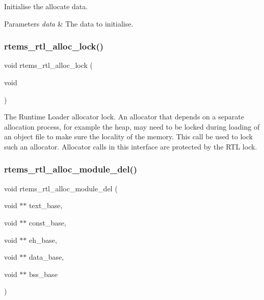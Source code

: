 Initialise the allocate data.


\begin{DoxyParams}{Parameters}
{\em data} & The data to initialise. \\
\hline
\end{DoxyParams}
\mbox{\label{rtl-allocator_8c_aca4dbc8b7c392bb60b9aa241f23773e5}} 
\subsubsection{\texorpdfstring{rtems\_rtl\_alloc\_lock()}{rtems\_rtl\_alloc\_lock()}}
{\footnotesize\ttfamily void rtems\+\_\+rtl\+\_\+alloc\+\_\+lock (\begin{DoxyParamCaption}\item[{void}]{ }\end{DoxyParamCaption})}

The Runtime Loader allocator lock. An allocator that depends on a separate allocation process, for example the heap, may need to be locked during loading of an object file to make sure the locality of the memory. This call be used to lock such an allocator. Allocator calls in this interface are protected by the R\+TL lock. \mbox{\label{rtl-allocator_8c_a718eab4a84e05b311c40633cd0f793e5}} 
\subsubsection{\texorpdfstring{rtems\_rtl\_alloc\_module\_del()}{rtems\_rtl\_alloc\_module\_del()}}
{\footnotesize\ttfamily void rtems\+\_\+rtl\+\_\+alloc\+\_\+module\+\_\+del (\begin{DoxyParamCaption}\item[{void $\ast$$\ast$}]{text\+\_\+base,  }\item[{void $\ast$$\ast$}]{const\+\_\+base,  }\item[{void $\ast$$\ast$}]{eh\+\_\+base,  }\item[{void $\ast$$\ast$}]{data\+\_\+base,  }\item[{void $\ast$$\ast$}]{bss\+\_\+base }\end{DoxyParamCaption})}

